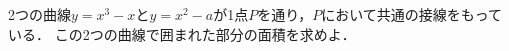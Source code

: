 \documentclass[../../main.tex]{subfiles}
\begin{document}
2つの曲線$y=x^3-x$と$y=x^2-a$が1点$P$を通り，$P$において共通の接線をもっている．
この2つの曲線で囲まれた部分の面積を求めよ．
\end{document}
